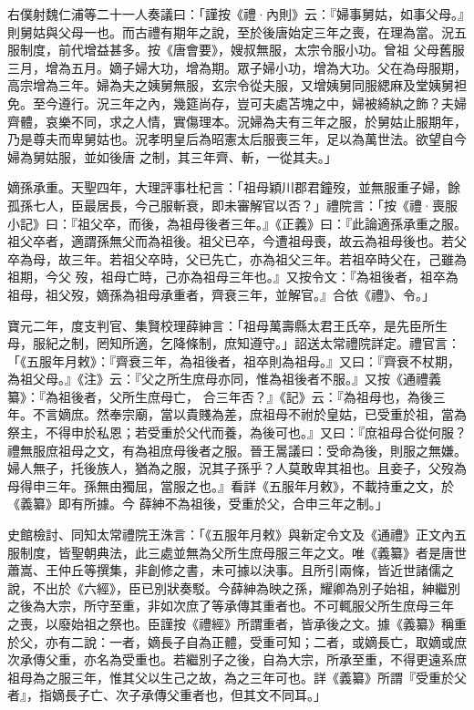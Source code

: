 \begin{pinyinscope}
 右僕射魏仁浦等二十一人奏議曰：「謹按《禮·內則》云：『婦事舅姑，如事父母。』則舅姑與父母一也。而古禮有期年之說，至於後唐始定三年之喪，在理為當。況五服制度，前代增益甚多。按《唐會要》，嫂叔無服，太宗令服小功。曾祖
 父母舊服三月，增為五月。嫡子婦大功，增為期。眾子婦小功，增為大功。父在為母服期，高宗增為三年。婦為夫之姨舅無服，玄宗令從夫服，又增姨舅同服緦麻及堂姨舅袒免。至今遵行。況三年之內，幾筵尚存，豈可夫處苫塊之中，婦被綺紈之飾？夫婦齊體，哀樂不同，求之人情，實傷理本。況婦為夫有三年之服，於舅姑止服期年，乃是尊夫而卑舅姑也。況孝明皇后為昭憲太后服喪三年，足以為萬世法。欲望自今婦為舅姑服，並如後唐
 之制，其三年齊、斬，一從其夫。」



 嫡孫承重。天聖四年，大理評事杜杞言：「祖母穎川郡君鐘歿，並無服重子婦，餘孤孫七人，臣最居長，今己服斬衰，即未審解官以否？」禮院言：「按《禮·喪服小記》曰：『祖父卒，而後，為祖母後者三年。』《正義》曰：『此論適孫承重之服。祖父卒者，適謂孫無父而為祖後。祖父已卒，今遭祖母喪，故云為祖母後也。若父卒為母，故三年。若祖父卒時，父已先亡，亦為祖父三年。若祖卒時父在，己雖為祖期，今父
 歿，祖母亡時，己亦為祖母三年也。』又按令文：『為祖後者，祖卒為祖母，祖父歿，嫡孫為祖母承重者，齊衰三年，並解官。』合依《禮》、令。」



 寶元二年，度支判官、集賢校理薛紳言：「祖母萬壽縣太君王氏卒，是先臣所生母，服紀之制，罔知所適，乞降條制，庶知遵守。」詔送太常禮院詳定。禮官言：「《五服年月敕》：『齊衰三年，為祖後者，祖卒則為祖母。』又曰：『齊衰不杖期，為祖父母。』《注》云：『父之所生庶母亦同，惟為祖後者不服。』又按《通禮義纂》：『為祖後者，父所生庶母亡，
 合三年否？』《記》云：『為祖母也，為後三年。不言嫡庶。然奉宗廟，當以貴賤為差，庶祖母不祔於皇姑，已受重於祖，當為祭主，不得申於私恩；若受重於父代而養，為後可也。』又曰：『庶祖母合從何服？禮無服庶祖母之文，有為祖庶母後者之服。晉王暠議曰：受命為後，則服之無嫌。婦人無子，托後族人，猶為之服，況其子孫乎？人莫敢卑其祖也。且妾子，父歿為母得申三年。孫無由獨屈，當服之也。』看詳《五服年月敕》，不載持重之文，於《義纂》即有所據。今
 薛紳不為祖後，受重於父，合申三年之制。」



 史館檢討、同知太常禮院王洙言：「《五服年月敕》與新定令文及《通禮》正文內五服制度，皆聖朝典法，此三處並無為父所生庶母服三年之文。唯《義纂》者是唐世蕭嵩、王仲丘等撰集，非創修之書，未可據以決事。且所引兩條，皆近世諸儒之說，不出於《六經》，臣已別狀奏駁。今薛紳為映之孫，耀卿為別子始祖，紳繼別之後為大宗，所守至重，非如次庶了等承傳其重者也。不可輒服父所生庶母三年
 之喪，以廢始祖之祭也。臣謹按《禮經》所謂重者，皆承後之文。據《義纂》稱重於父，亦有二說：一者，嫡長子自為正體，受重可知；二者，或嫡長亡，取嫡或庶次承傳父重，亦名為受重也。若繼別子之後，自為大宗，所承至重，不得更遠系庶祖母為之服三年，惟其父以生己之故，為之三年可也。詳《義纂》所謂『受重於父者』，指嫡長子亡、次子承傳父重者也，但其文不同耳。」




\end{pinyinscope}
